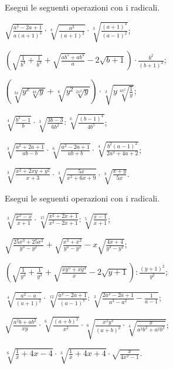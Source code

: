 \begin{esercizio}[\Ast]
 \label{ese:2.79}
Esegui le seguenti operazioni con i radicali.
 \begin{enumeratea}
 \item $\sqrt{\frac{a^2-2a+1}{a(a+1)^3}}\cdot \sqrt[4]{\frac{a^2}{(a+1)^2}}\cdot \sqrt[3]{\frac{(a+1)^3}{(a-1)^2}}$;
 \item $\left(\sqrt{\frac 1{b^4}+\frac 1{b^3}}+\sqrt{\frac{ab^5+ab^4} a}-2\sqrt{b+1}\right)\cdot \frac{b^2}{(b+1)^2}$;
 \item $\left(\sqrt[3x]{y^x\sqrt[4x]y}+\sqrt[6]{y^2\sqrt[2x^2]y}\right)\cdot \sqrt[3]{y\sqrt[4x^2]{\frac 1 y}}$;
 \item $\sqrt[4]{\frac{b^2-1} b}\cdot \sqrt[3]{\frac{3b-3}{6b^2}}:\sqrt[6]{\frac{(b-1)^4}{4b^5}}$;
 \item $\sqrt[3]{\frac{a^2+2a+1}{ab-b}}\cdot \sqrt[6]{\frac{a^2-2a+1}{ab+b}}\cdot \sqrt[4]{\frac{b^2(a-1)^2}{2a^2+4a+2}}$;
 \item $\sqrt[3]{\frac{x^2+2xy+y^2}{x+3}}\cdot \sqrt[3]{\frac{5x}{x^2+6x+9}}\cdot \sqrt[3]{\frac{x+y}{5x}}$.
 \end{enumeratea}
\end{esercizio}

\begin{esercizio}[\Ast]
 \label{ese:2.80}
Esegui le seguenti operazioni con i radicali.
 \begin{enumeratea}
 \item $\sqrt[3]{\frac{x^2-x}{x+1}}\cdot \sqrt[15]{\frac{x^2+2x+1}{x^2-2x+1}}:\sqrt[5]{\frac{x-1}{x+1}}$;
 \item $\sqrt{\frac{25x^3+25x^2}{y^3-y^2}}+\sqrt{\frac{x^3+x^2}{y^3-y^2}}-x\sqrt{\frac{4x+4}{y^3-y^2}}$;
 \item $\left(\sqrt{\frac 1{y^4}+\frac 1{y^3}}+\sqrt{\frac{xy^5+xy^4} x}-2\sqrt{y+1}\right):\frac{(y+1)^2}{y^2}$;
 \item $\sqrt[4]{\frac{a^2-a}{(a+1)^2}}\cdot \sqrt[12]{\frac{a^2-2a+1}{(a-1)^7}}:\sqrt[3]{\frac{2a^2-2a+1}{a^3-a^2}-\frac 1{a-1}}$;
 \item $\sqrt{\frac{a^2b+ab^2}{xy}}\cdot \sqrt[6]{\frac{(a+b)^2}{x^2}}\cdot \sqrt[6]{\frac{x^2y^3}{(a+b)^2}\cdot \sqrt[4]{\frac x{a^3b^2+a^2b^3}}}$;
 \item $\sqrt[6]{\frac 1 x+4x-4}\cdot \sqrt[3]{\frac 1 x+4x+4}\cdot \sqrt{\frac x{4x^2-1}}$.
 \end{enumeratea}
\end{esercizio}

